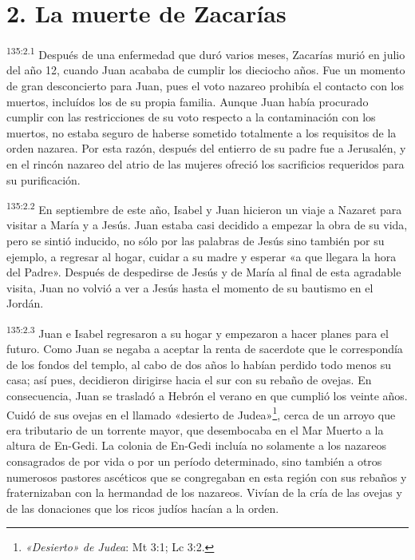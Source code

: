 \section*{2. La muerte de Zacarías}
\par
\textsuperscript{135:2.1} Después de una enfermedad que duró varios meses, Zacarías murió en julio del año 12, cuando Juan acababa de cumplir los dieciocho años. Fue un momento de gran desconcierto para Juan, pues el voto nazareo prohibía el contacto con los muertos, incluídos los de su propia familia. Aunque Juan había procurado cumplir con las restricciones de su voto respecto a la contaminación con los muertos, no estaba seguro de haberse sometido totalmente a los requisitos de la orden nazarea. Por esta razón, después del entierro de su padre fue a Jerusalén, y en el rincón nazareo del atrio de las mujeres ofreció los sacrificios requeridos para su purificación.

\par
\textsuperscript{135:2.2} En septiembre de este año, Isabel y Juan hicieron un viaje a Nazaret para visitar a María y a Jesús. Juan estaba casi decidido a empezar la obra de su vida, pero se sintió inducido, no sólo por las palabras de Jesús sino también por su ejemplo, a regresar al hogar, cuidar a su madre y esperar «a que llegara la hora del Padre». Después de despedirse de Jesús y de María al final de esta agradable visita, Juan no volvió a ver a Jesús hasta el momento de su bautismo en el Jordán.

\par
\textsuperscript{135:2.3} Juan e Isabel regresaron a su hogar y empezaron a hacer planes para el futuro. Como Juan se negaba a aceptar la renta de sacerdote que le correspondía de los fondos del templo, al cabo de dos años lo habían perdido todo menos su casa; así pues, decidieron dirigirse hacia el sur con su rebaño de ovejas. En consecuencia, Juan se trasladó a Hebrón el verano en que cumplió los veinte años. Cuidó de sus ovejas en el llamado «desierto de Judea»\footnote{\textit{«Desierto» de Judea}: Mt 3:1; Lc 3:2.}, cerca de un arroyo que era tributario de un torrente mayor, que desembocaba en el Mar Muerto a la altura de En-Gedi. La colonia de En-Gedi incluía no solamente a los nazareos consagrados de por vida o por un período determinado, sino también a otros numerosos pastores ascéticos que se congregaban en esta región con sus rebaños y fraternizaban con la hermandad de los nazareos. Vivían de la cría de las ovejas y de las donaciones que los ricos judíos hacían a la orden.

